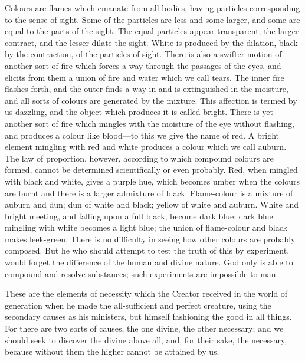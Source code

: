 \documentclass[11pt,letter]{article}
\begin{document}
\par  Colours are flames which emanate from all bodies, having particles corresponding to the sense of sight. Some of the particles are less and some larger, and some are equal to the parts of the sight. The equal particles appear transparent; the larger contract, and the lesser dilate the sight. White is produced by the dilation, black by the contraction, of the particles of sight. There is also a swifter motion of another sort of fire which forces a way through the passages of the eyes, and elicits from them a union of fire and water which we call tears. The inner fire flashes forth, and the outer finds a way in and is extinguished in the moisture, and all sorts of colours are generated by the mixture. This affection is termed by us dazzling, and the object which produces it is called bright. There is yet another sort of fire which mingles with the moisture of the eye without flashing, and produces a colour like blood—to this we give the name of red. A bright element mingling with red and white produces a colour which we call auburn. The law of proportion, however, according to which compound colours are formed, cannot be determined scientifically or even probably. Red, when mingled with black and white, gives a purple hue, which becomes umber when the colours are burnt and there is a larger admixture of black. Flame-colour is a mixture of auburn and dun; dun of white and black; yellow of white and auburn. White and bright meeting, and falling upon a full black, become dark blue; dark blue mingling with white becomes a light blue; the union of flame-colour and black makes leek-green. There is no difficulty in seeing how other colours are probably composed. But he who should attempt to test the truth of this by experiment, would forget the difference of the human and divine nature. God only is able to compound and resolve substances; such experiments are impossible to man.

\par  These are the elements of necessity which the Creator received in the world of generation when he made the all-sufficient and perfect creature, using the secondary causes as his ministers, but himself fashioning the good in all things. For there are two sorts of causes, the one divine, the other necessary; and we should seek to discover the divine above all, and, for their sake, the necessary, because without them the higher cannot be attained by us.
\end{document}
